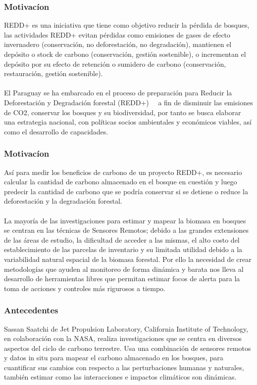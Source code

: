 \documentclass[xcolor=table]{beamer}
\begin{document}
\begin{frame}
	\frametitle{Motivac\'ion}
REDD+ es una iniciativa que tiene como objetivo reducir la p\'erdida de bosques, las actividades REDD+ evitan p\'erdidas como emisiones de gases de efecto invernadero (conservaci\'on, no deforestaci\'on, no degradaci\'on), mantienen el dep\'osito o stock de carbono (conservaci\'on, gesti\'on sostenible), o incrementan el dep\'osito por su efecto de retenci\'on o sumidero de carbono (conservaci\'on, restauraci\'on, gesti\'on sostenible).\\~\\
	
El Paraguay se ha embarcado en el proceso de preparaci\'on para Reducir la Deforestaci\'on y Degradaci\'on forestal (REDD+)   a fin de disminuir las emisiones de CO2, conservar los bosques y su biodiversidad, por tanto se busca elaborar una estrategia nacional, con pol\'iticas socios ambientales y econ\'omicos viables, as\'i como el desarrollo de capacidades.
	
	
\end{frame}

\begin{frame}
	\frametitle{Motivac\'ion}
As\'i para medir los beneficios de carbono de un proyecto REDD+, es necesario calcular la cantidad de carbono almacenado en el bosque en cuesti\'on y luego predecir la cantidad de carbono que se podr\'ia conservar si se detiene o reduce la deforestaci\'on y la degradaci\'on forestal.\\~\\
	
La mayor\'ia de las investigaciones para estimar y mapear la biomasa en bosques se centran en las t\'ecnicas de Sensores Remotos; debido a las grandes extensiones de las \'areas de estudio, la dificultad de acceder a las mismas, el alto costo del establecimiento de las parcelas de inventario y su limitada utilidad debido a la variabilidad natural espacial de la biomasa forestal. Por ello la necesidad de crear metodolog\'ias que ayuden al monitoreo de forma din\'amica y barata nos lleva al desarrollo de herramientas libres que permitan estimar focos de alerta para la toma de acciones y controles m\'as rigurosos a tiempo.
	
	
\end{frame}



\begin{frame}
	\frametitle{Antecedentes}
	Sassan Saatchi de Jet Propulsion Laboratory, California Institute of Technology, en colaboraci\'on con la NASA, realiza investigaciones que se centra en diversos aspectos del ciclo de carbono terrestre. Usa una combinaci\'on de sensores remotos y datos in situ para mapear el carbono almacenado en los bosques, para cuantificar sus cambios con respecto a las perturbaciones humanas y naturales, tambi\'en estimar como las interacciones e impactos clim\'aticos son din\'amicas. 
	
	
\end{frame}
\end{document}
